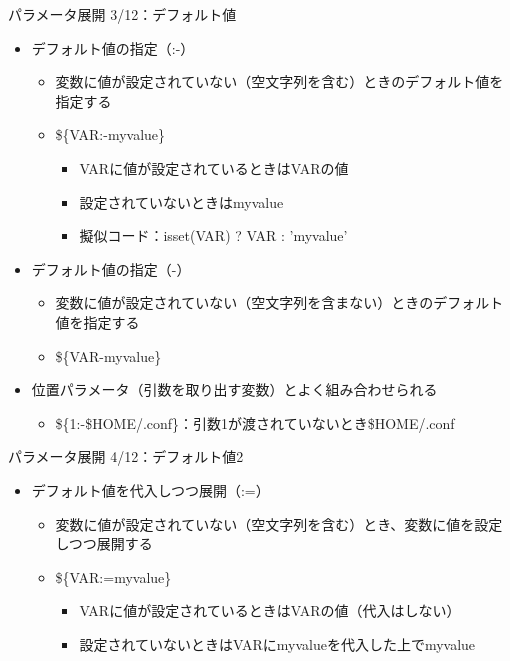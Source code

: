 \documentclass[12pt,aspectratio=169]{beamer}
\begin{document}
\begin{frame}{パラメータ展開 3/12：デフォルト値}

  \begin{itemize}
    \item デフォルト値の指定（:-）
      \begin{itemize}
        \item 変数に値が設定されていない（空文字列を含む）ときのデフォルト値を指定する
        \item \$\{VAR:-myvalue\}
          \begin{itemize}
            \item VARに値が設定されているときはVARの値
            \item 設定されていないときはmyvalue
            \item 擬似コード：isset(VAR) ? VAR : 'myvalue'
          \end{itemize}
      \end{itemize}
    \item デフォルト値の指定（-）
      \begin{itemize}
        \item 変数に値が設定されていない（空文字列を含まない）ときのデフォルト値を指定する
        \item \$\{VAR-myvalue\}
      \end{itemize}
    \item 位置パラメータ（引数を取り出す変数）とよく組み合わせられる
      \begin{itemize}
          \item \$\{1:-\$HOME/.conf\}：引数1が渡されていないとき\$HOME/.conf
      \end{itemize}

  \end{itemize}

\end{frame}


\begin{frame}{パラメータ展開 4/12：デフォルト値2}

  \begin{itemize}
    \item デフォルト値を代入しつつ展開（:=）
      \begin{itemize}
        \item 変数に値が設定されていない（空文字列を含む）とき、変数に値を設定しつつ展開する
        \item \$\{VAR:=myvalue\}
          \begin{itemize}
            \item VARに値が設定されているときはVARの値（代入はしない）
            \item 設定されていないときはVARにmyvalueを代入した上でmyvalue
          \end{itemize}
      \end{itemize}

  \end{itemize}

\end{frame}
\end{document}
